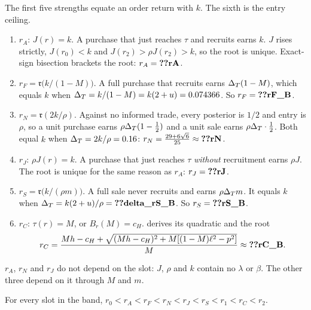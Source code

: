 The first five strengths equate an order return with \(k\). The sixth is the entry ceiling.
\begin{enumerate}[leftmargin=2em]
\item \(r_A\): \(J(r)=k\). A purchase that just reaches \(\tau\) and recruits earns \(k\). \(J\) rises strictly,
\(J(r_0)<k\) and \(J(r_2)>\rho J(r_2)>k\), so the root is unique. Exact-sign bisection brackets the root: \(r_A=\reg{rA}\).
\item \(r_F=\mathfrak r\bigl(k/(1-M)\bigr)\). A full purchase that recruits earns \(\Delta_T(1-M)\), which equals \(k\) when
\(\Delta_T=k/(1-M)=k(2+u)=0.074366\). %
So \(r_F=\reg{rF_B}\).
\item \(r_N=\mathfrak r(2k/\rho)\). Against no informed trade, every posterior is \(1/2\) and entry is \(\rho\), so a unit
purchase earns \(\rho\Delta_T(1-\tfrac12)\) and a unit sale earns \(\rho\Delta_T\cdot\tfrac12\). Both equal \(k\) when
\(\Delta_T=2k/\rho=0.16\): \(r_N=\frac{29+6\sqrt6}{25}\approx\reg{rN}\). %
\item \(r_J\): \(\rho J(r)=k\). A purchase that just reaches \(\tau\) \emph{without} recruitment earns \(\rho J\). The root
is unique for the same reason as \(r_A\): \(r_J=\reg{rJ}\).
\item \(r_S=\mathfrak r\bigl(k/(\rho m)\bigr)\). A full sale never recruits and earns \(\rho\Delta_T m\). It equals \(k\) when
\(\DT=k(2+u)/\rho=\reg{delta_rS_B}\). So \(r_S=\reg{rS_B}\).
\item \(r_C\): \(\tau(r)=M\), or \(B_r(M)=c_H\).
 derives its quadratic and the root
\[
r_C=\frac{Mh-c_H+\sqrt{(Mh-c_H)^2+M[(1-M)\ell^2-p^2]}}{M}
\approx\reg{rC_B}.
\]
\end{enumerate}
\(r_A\), \(r_N\) and \(r_J\) do not depend on the slot: \(J\), \(\rho\) and \(k\) contain no \(\lambda\) or \(\beta\). The
other three depend on it through \(M\) and \(m\).

\begin{resultbox}
For every slot in the band, \(r_0<r_A<r_F<r_N<r_J<r_S<r_1<r_C<r_2\).
\end{resultbox}


